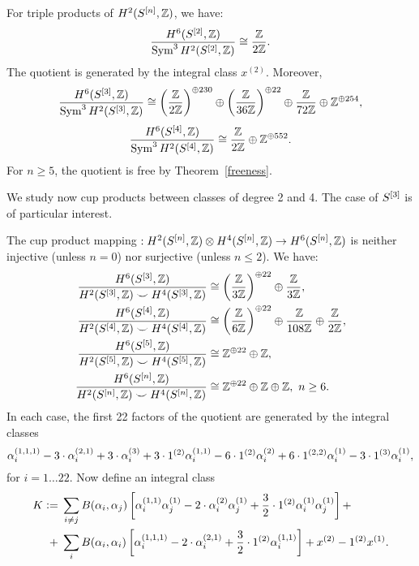 \begin{proposition} For triple products of $H^2(S^{[n]},\mathbb{Z})$, we have:
$$
\frac{H^6(S^{[2]},\mathbb{Z})}{\operatorname{Sym}^3 H^2(S^{[2]},\mathbb{Z})} \cong 
\frac{\mathbb{Z}}{2\mathbb{Z}}.
$$
The quotient is generated by the integral class $x^{(2)}$. Moreover,
$$
\frac{H^6(S^{[3]},\mathbb{Z})}{\operatorname{Sym}^3 H^2(S^{[3]},\mathbb{Z})} \cong  \left(\frac{\mathbb{Z}}{2\mathbb{Z}}\right)^{\oplus 230}\oplus \left(\frac{\mathbb{Z}}{36\mathbb{Z}}\right)^{\oplus 22}\oplus \frac{\mathbb{Z}}{72\mathbb{Z}} \oplus \mathbb{Z}^{\oplus 254},
$$
$$
\frac{H^6(S^{[4]},\mathbb{Z})}{\operatorname{Sym}^3 H^2(S^{[4]},\mathbb{Z})} \cong  \frac{\mathbb{Z}}{2\mathbb{Z}} \oplus \mathbb{Z}^{\oplus 552}.
$$
For $n\geq 5$, the quotient is free by Theorem~\ref{freeness}.
\end{proposition}
We study now cup products between classes of degree 2 and 4. The case of $S^{[3]}$ is of particular interest.
\begin{proposition} \label{p24}The cup product mapping $ : H^2(S^{[n]},\mathbb{Z})\otimes H^4(S^{[n]},\mathbb{Z}) \rightarrow H^6(S^{[n]},\mathbb{Z}) $ is neither injective (unless $n=0$) nor surjective (unless $n\leq 2$). We have:
\setcounter{equation}{0} 
\begin{align} 
\frac{H^6(S^{[3]},\mathbb{Z})}{H^2(S^{[3]},\mathbb{Z})\smile H^4(S^{[3]},\mathbb{Z})} &\cong \left(\frac{\mathbb{Z}}{3\mathbb{Z}}\right)^{\oplus 22} \oplus \frac{\mathbb{Z}}{3\mathbb{Z}},
\\
\frac{H^6(S^{[4]},\mathbb{Z})}{H^2(S^{[4]},\mathbb{Z})\smile H^4(S^{[4]},\mathbb{Z})} &\cong  \left(\frac{\mathbb{Z}}{6\mathbb{Z}}\right)^{\oplus 22}\oplus\frac{\mathbb{Z}}{108\mathbb{Z}} \oplus\frac{\mathbb{Z}}{2\mathbb{Z}} ,
\\
\frac{H^6(S^{[5]},\mathbb{Z})}{H^2(S^{[5]},\mathbb{Z})\smile H^4(S^{[5]},\mathbb{Z})} &\cong 
 \mathbb{Z}^{\oplus 22} \oplus \mathbb{Z},
\\
\frac{H^6(S^{[n]},\mathbb{Z})}{H^2(S^{[n]},\mathbb{Z})\smile H^4(S^{[n]},\mathbb{Z})} &\cong 
 \mathbb{Z}^{\oplus 22} \oplus \mathbb{Z}\oplus\mathbb{Z}, \ n\geq 6.
\end{align}
In each case, the first 22 factors of the quotient are generated by the integral classes 
 $$
\alpha_i^{(1,1,1)} -3\cdot \alpha_i^{(2,1)} + 3\cdot \alpha_i^{(3)}+ 3 \cdot 1^{(2)}\alpha_i^{(1,1)} -6\cdot 1^{(2)}\alpha_i^{(2)}+6\cdot 1^{(2,2)}\alpha_i^{(1)}-3\cdot 1^{(3)}\alpha_i^{(1)},
$$ 
for $ i=1\ldots 22$. Now define an integral class
\begin{align*}
K\defIs &\;\sum_{i\neq j} B(\alpha_i,\alpha_j)\left[\alpha_i^{(1,1)}\alpha_j^{(1)} - 2\cdot\alpha_i^{(2)}\alpha_j^{(1)}+\frac{3}{2}\cdot \One^{(2)}\alpha_i^{(1)}\alpha_j^{(1)} \right] +\\
+&\;\sum_{i}B(\alpha_i,\alpha_i)\left[\alpha_i^{(1,1,1)} - 2\cdot\alpha_i^{(2,1)} + \frac{3}{2}\cdot \One^{(2)}\alpha_i^{(1,1)} \right]+  x^{(2)}-\One^{(2)}x^{(1)}.

\end{align*}
\end{proposition}
